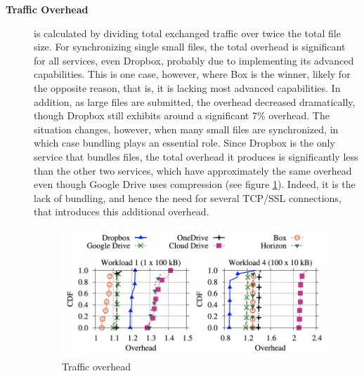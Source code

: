 \begin{description}
    \item[\textbf{Traffic Overhead}] is calculated by dividing total exchanged traffic over twice the total file size. For synchronizing single small files, the total overhead is significant for all services, even Dropbox, probably due to implementing its advanced capabilities. This is one case, however, where Box is the winner, likely for the opposite reason, that is, it is lacking most advanced capabilities. In addition, as large files are submitted, the overhead decreased dramatically, though Dropbox still exhibits around a significant 7\% overhead. The situation changes, however, when many small files are synchronized, in which case bundling plays an essential role. Since Dropbox is the only service that bundles files, the total overhead it produces is significantly less than the other two services, which have approximately the same overhead even though Google Drive uses compression (see figure \ref{fig:traffic overhead}). Indeed, it is the lack of bundling, and hence the need for several TCP/SSL connections, that introduces this additional overhead.

    \begin{figure} [h]
        \centering
        \includegraphics[scale=0.7]{images/traffic_overhead}
        \caption{\label{fig:traffic overhead}Traffic overhead}
    \end{figure}

\end{description}

